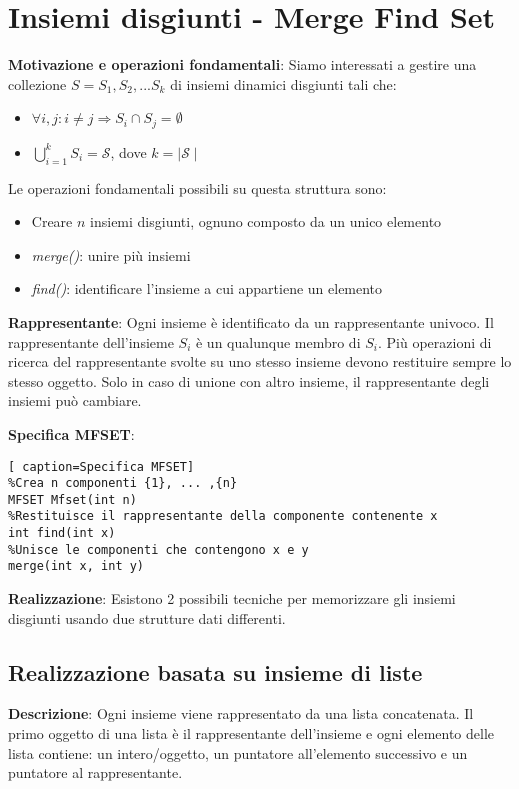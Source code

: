 \documentclass[../cheatSheetAlgoritmi.tex]{subfiles}
\begin{document}
\section{Insiemi disgiunti - Merge Find Set}
\textbf{Motivazione e operazioni fondamentali}: Siamo interessati a gestire una collezione 	\hfill \break $S = {S_1, S_2, ...S_k}$ di insiemi dinamici disgiunti tali che: 
\begin{itemize}
	\item $\forall i,j : i \neq j \Rightarrow S_i \cap S_j = \emptyset$ 
	\item $\bigcup\limits_{i=1}^{k} S_i = \mathcal{S}$, dove $k =\mid \mathcal{S} \mid$
\end{itemize}
Le operazioni fondamentali possibili su questa struttura sono:
\begin{itemize}
	\item Creare $n$ insiemi disgiunti, ognuno composto da un unico elemento
	\item \emph{merge()}: unire più insiemi
	\item \emph{find()}: identificare l'insieme a cui appartiene un elemento
\end{itemize}
\textbf{Rappresentante}: Ogni insieme è identificato da un rappresentante univoco. Il rappresentante dell'insieme $S_i$ è un qualunque membro di $S_i$. Più operazioni di ricerca del rappresentante svolte su uno stesso insieme devono restituire sempre lo stesso oggetto. Solo in caso di unione con altro insieme, il rappresentante degli insiemi può cambiare.

\bigskip

\textbf{Specifica MFSET}:
\begin{lstlisting}[ caption=Specifica MFSET]
%Crea n componenti {1}, ... ,{n}
MFSET Mfset(int n)
%Restituisce il rappresentante della componente contenente x
int find(int x)
%Unisce le componenti che contengono x e y
merge(int x, int y)
\end{lstlisting}
\textbf{Realizzazione}: Esistono 2 possibili tecniche per memorizzare gli insiemi disgiunti usando due strutture dati differenti.
\subsection{Realizzazione basata su insieme di liste}
\textbf{Descrizione}: Ogni insieme viene rappresentato da una lista concatenata. Il primo oggetto di una lista è il rappresentante dell'insieme e ogni elemento delle lista contiene: un intero/oggetto, un puntatore all'elemento successivo e un puntatore al rappresentante.
\end{document}
